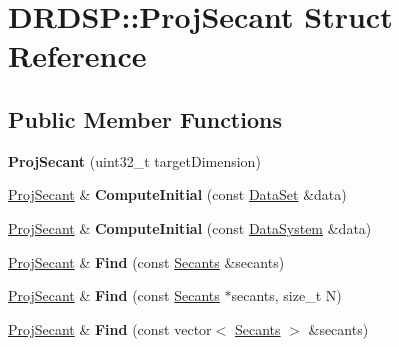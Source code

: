 \hypertarget{struct_d_r_d_s_p_1_1_proj_secant}{\section{D\-R\-D\-S\-P\-:\-:Proj\-Secant Struct Reference}
\label{struct_d_r_d_s_p_1_1_proj_secant}
}
\subsection*{Public Member Functions}
\begin{DoxyCompactItemize}
\item 
\hypertarget{struct_d_r_d_s_p_1_1_proj_secant_ae2afae510f9abf0a5163529ee09128f8}{{\bfseries Proj\-Secant} (uint32\-\_\-t target\-Dimension)}\label{struct_d_r_d_s_p_1_1_proj_secant_ae2afae510f9abf0a5163529ee09128f8}

\item 
\hypertarget{struct_d_r_d_s_p_1_1_proj_secant_aa55fa8720a3fc21364865b8a7939ab57}{\hyperlink{struct_d_r_d_s_p_1_1_proj_secant}{Proj\-Secant} \& {\bfseries Compute\-Initial} (const \hyperlink{struct_d_r_d_s_p_1_1_data_set}{Data\-Set} \&data)}\label{struct_d_r_d_s_p_1_1_proj_secant_aa55fa8720a3fc21364865b8a7939ab57}

\item 
\hypertarget{struct_d_r_d_s_p_1_1_proj_secant_aa6efb6dce18044a7284965904b1ac755}{\hyperlink{struct_d_r_d_s_p_1_1_proj_secant}{Proj\-Secant} \& {\bfseries Compute\-Initial} (const \hyperlink{struct_d_r_d_s_p_1_1_data_system}{Data\-System} \&data)}\label{struct_d_r_d_s_p_1_1_proj_secant_aa6efb6dce18044a7284965904b1ac755}

\item 
\hypertarget{struct_d_r_d_s_p_1_1_proj_secant_a1b4b5d140093eab8a0313a035ad35f7a}{\hyperlink{struct_d_r_d_s_p_1_1_proj_secant}{Proj\-Secant} \& {\bfseries Find} (const \hyperlink{struct_d_r_d_s_p_1_1_secants}{Secants} \&secants)}\label{struct_d_r_d_s_p_1_1_proj_secant_a1b4b5d140093eab8a0313a035ad35f7a}

\item 
\hypertarget{struct_d_r_d_s_p_1_1_proj_secant_ad6422b7edf25dec73c435bbbc83179d2}{\hyperlink{struct_d_r_d_s_p_1_1_proj_secant}{Proj\-Secant} \& {\bfseries Find} (const \hyperlink{struct_d_r_d_s_p_1_1_secants}{Secants} $\ast$secants, size\-\_\-t N)}\label{struct_d_r_d_s_p_1_1_proj_secant_ad6422b7edf25dec73c435bbbc83179d2}

\item 
\hypertarget{struct_d_r_d_s_p_1_1_proj_secant_af6176307efdb61f11ba39aa8bd155322}{\hyperlink{struct_d_r_d_s_p_1_1_proj_secant}{Proj\-Secant} \& {\bfseries Find} (const vector$<$ \hyperlink{struct_d_r_d_s_p_1_1_secants}{Secants} $>$ \&secants)}\label{struct_d_r_d_s_p_1_1_proj_secant_af6176307efdb61f11ba39aa8bd155322}


\end{DoxyCompactItemize}

